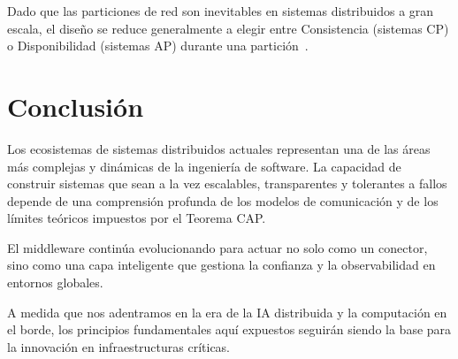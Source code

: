 \documentclass[12pt,a4paper]{article}
\begin{document}
Dado que las particiones de red son inevitables en sistemas distribuidos a gran escala, el diseño se reduce generalmente a elegir entre Consistencia (sistemas CP) o Disponibilidad (sistemas AP) durante una partición~\cite{r24}.

\section{Conclusión}

Los ecosistemas de sistemas distribuidos actuales representan una de las áreas más complejas y dinámicas de la ingeniería de software. La capacidad de construir sistemas que sean a la vez escalables, transparentes y tolerantes a fallos depende de una comprensión profunda de los modelos de comunicación y de los límites teóricos impuestos por el Teorema CAP.

El middleware continúa evolucionando para actuar no solo como un conector, sino como una capa inteligente que gestiona la confianza y la observabilidad en entornos globales.

A medida que nos adentramos en la era de la IA distribuida y la computación en el borde, los principios fundamentales aquí expuestos seguirán siendo la base para la innovación en infraestructuras críticas.



\end{document}
